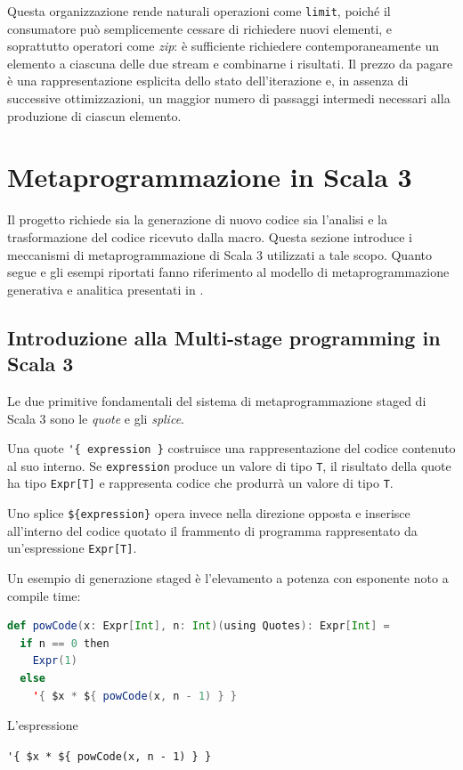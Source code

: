 \documentclass[a4paper,11pt]{report}
\theoremstyle{definition}
\begin{document}
Questa organizzazione rende naturali operazioni come \texttt{limit}, poiché il consumatore può semplicemente cessare di richiedere nuovi elementi, e soprattutto operatori come \emph{zip}: è sufficiente richiedere contemporaneamente un elemento a ciascuna delle due stream e combinarne i risultati. Il prezzo da pagare è una rappresentazione esplicita dello stato dell'iterazione e, in assenza di successive ottimizzazioni, un maggior numero di passaggi intermedi necessari alla produzione di ciascun elemento.
\section{Metaprogrammazione in Scala 3}
Il progetto richiede sia la generazione di nuovo codice sia l'analisi e la trasformazione del codice ricevuto dalla macro. Questa sezione introduce i meccanismi di metaprogrammazione di Scala 3 utilizzati a tale scopo. Quanto segue e gli esempi riportati fanno riferimento al modello di metaprogrammazione generativa e analitica presentati in \cite{stucki2021multi,stucki2023scalable}.
\subsection{Introduzione alla Multi-stage programming in Scala 3}
\label{sec:multistage}

Le due primitive fondamentali del sistema di metaprogrammazione staged di Scala 3 sono le \emph{quote} e gli \emph{splice}.

Una quote \verb|'{ expression }| costruisce una rappresentazione del codice contenuto al suo interno. Se \texttt{expression} produce un valore di tipo \verb|T|, il risultato della quote ha tipo \verb|Expr[T]| e rappresenta codice che produrrà un valore di tipo \verb|T|.

Uno splice \verb|${expression}| opera invece nella direzione opposta e inserisce all'interno del codice quotato il frammento di programma rappresentato da un'espressione \verb|Expr[T]|.

Un esempio di generazione staged è l'elevamento a potenza con esponente noto a compile time:

\begin{lstlisting}[language=Scala]
def powCode(x: Expr[Int], n: Int)(using Quotes): Expr[Int] =
  if n == 0 then
    Expr(1)
  else
    '{ $x * ${ powCode(x, n - 1) } }
\end{lstlisting}

L'espressione

\begin{center}
  \verb|'{ $x * ${ powCode(x, n - 1) } }|
\end{center}
\end{document}
